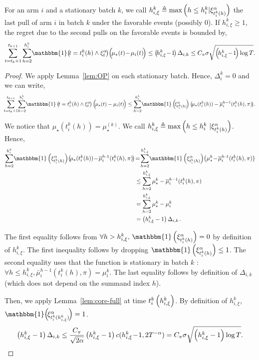 \begin{lemma}
\label{lem:OP-piecewise}
For an arm $i$ and a stationary batch $k$, we call $h_{i,\xi}^k \triangleq \max\left(h \leq h_i^k | \xi^\alpha_{{t_i^k(h)}} \right)$ the last pull of arm $i$ in batch $k$ under the favorable events (possibly 0). If $h_{i,\xi}^k \geq 1$, the regret due to the second pulls on the favorable events is bounded by,
\[
\sum_{t=t_{k}+1}^{t_{k+1}} \sum_{h=2}^{h_{i}^{k}} \!\mathbbm{1}\!\pa{\! t=t_{i}^{k}(h) \land \HPevent \!}\!\Big(\!\mu_{\star}(t)\!-\!\mu_{i}(t)\!\Big) \leq\pa{\!h_{i, \xi}^{k}\!-\!1 \!} \Delta_{i, k} \leq C_\pi\sigma \sqrt{\pa{\!h_{i,\xi}^k\!-\!1\!}\log{T}}.
\]
\end{lemma}
\begin{proof}
We apply Lemma~\ref{lem:OP} on each stationary batch. Hence, $\Delta_i^k =0$ and we can write,
%
\begin{equation*}
\!\sum_{t=t_{k} +1 }^{t_{k+1}}\! \sum_{h=2}^{h^k_{i}} \! \mathbbm{1}\left(\!t = t_i^k(h) \land \HPevent \!\right)\Big(\! \mu_{\star}(t) - \mu_{i}(t)\!\Big) \leq   \sum_{h=2}^{h^k_{i}} \!\mathbbm{1}\left(\!\HPt{t_i^k(h)}\!\right)\pa{\!  \mu_{\star}(t_i^k(h)) - \bar{\mu}_i^{h-1}(t_i^k(h),\pi)\!}\! .
\end{equation*}

We notice that $\mu_{\star}(t_i^k(h)) = \mu_{\star}^{(k)}$. We call $h_{i,\xi}^k \triangleq \max\left(h \leq h_i^k\, \,| \xi^\alpha_{{t_i^k(h)}} \right)$. Hence,
\begin{align*}
\sum_{h=2}^{h^k_{i}}\!\mathbbm{1}\left(\HPt{t_i^k(h)}\right)\!\pa{ \! \mu_{\star}(t_i^k(h)) \!-\! \bar{\mu}_i^{h\!-\!1}(t_i^k(h),\pi)\!}  & \!=\! \sum_{h=2}^{h^k_{i,\xi}}\!\mathbbm{1}\left(\HPt{t_i^k(h)}\right)\!\pa{  \mu^k_{\star} \!-\! \bar{\mu}_i^{h\!-\!1}(t_i^k(h), \pi)} \\
 &\leq \sum_{h=2}^{h^k_{i, \xi}} \mu_{\star}^{k} - \bar{\mu}_i^{h-1}(t_i^k(h), \pi)\\
 &= \sum_{h=2}^{h^k_{i, \xi}} \mu_{\star}^{k} - \mu_i^k\\
 & = \pa{h_{i,\xi}^k - 1 }\Delta_{i,k}\, .  
\end{align*}

The first equality follows from $\forall h > h_{i,\xi}^k, \, \mathbbm{1}\left(\HPt{t_i^k(h)}\right) =0$ by definition of $h_{i,\xi}^k$. The first inequality follows by dropping $\mathbbm{1}\left(\HPt{t_i^k(h)}\right) \leq 1$. The second equality uses that the function is stationary in batch $k$ : $\forall h \leq h_{i,\xi}^k, \bar{\mu}_i^{h-1}(t_i^k(h), \pi) = \mu_{i}^k.$ The last equality follows by definition of $\Delta_{i,k}$ (which does not depend on the summand index $h$).

Then, we apply Lemma~\ref{lem:core-full} at time $t_i^k\left(h_{i,\xi}^k\right)$. By definition of $h_{i,\xi}^k$, $\mathbbm{1}\!\left(\!\HPt{t_i^k(h_{i,\xi}^k)\!}\right) = 1$.
\begin{align*}
 \left(h_{i,\xi}^k - 1 \right)\Delta_{i,k}  \leq \frac{C_\pi}{\sqrt{2\alpha}}\left(h_{i,\xi}^k - 1 \right)c(h_{i,\xi}^k\!-\!1, 2T^{-\alpha}) = C_\pi \sigma \sqrt{\left(h_{i,\xi}^k-1\right)\log{T}}.
\end{align*} 
\end{proof}

